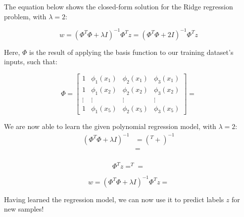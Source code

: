 \documentclass[12pt]{article}
\begin{document}
\begin{enumerate}[leftmargin=\labelsep]
        The equation below shows the closed-form solution for the Ridge regression
        problem, with $\lambda = 2$:

        \begin{equation*}
          w = (\Phi^T \Phi + \lambda I)^{-1} \Phi^T z = (\Phi^T \Phi + 2 I)^{-1} \Phi^T z
        \end{equation*}

        Here, $\Phi$ is the result of applying the basis function to our training
        dataset's inputs, such that:

        \begin{equation*}
          \Phi = \begin{bmatrix}
            1      & \phi_1(x_1) & \phi_2(x_1) & \phi_3(x_1) \\
            1      & \phi_1(x_2) & \phi_2(x_2) & \phi_3(x_2) \\
            \vdots & \vdots      & \vdots      & \vdots      \\
            1      & \phi_1(x_5) & \phi_2(x_5) & \phi_3(x_5)
          \end{bmatrix} = 
        \end{equation*}

        We are now able to learn the given polynomial regression model, with $\lambda = 2$:
        $$
          \begin{aligned}
            (\Phi^T \Phi + \lambda I)^{-1}
             & = \left(
            ^T
             +
            
            \right)^{-1}                        \\
             & =  \\
          \end{aligned}
        $$

        \begin{equation*}
          \Phi^T z = ^T
           = 
        \end{equation*}

        \begin{equation*}
          w = (\Phi^T \Phi + \lambda I)^{-1} \Phi^T z = 
        \end{equation*}

        Having learned the regression model, we can now use it to predict labels $z$
        for new samples!


\end{enumerate}
\end{document}

